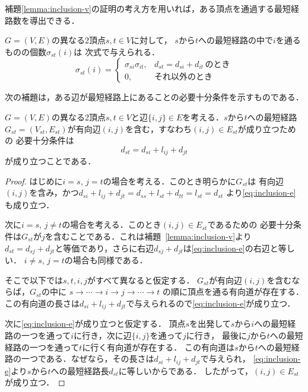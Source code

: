 補題\ref{lemma:inclusion-v}の証明の考え方を用いれば，ある頂点を通過する最短経路数を導出できる．

\begin{lemma-without-proof}
  $G=(V,E)$の異なる2頂点$s,t \in V$に対して，
  $s$から$t$への最短経路の中で$i$を通るものの個数$\sigma_{st}(i)$は
  次式で与えられる．
  \begin{equation}
    \sigma_{st}(i)=
    \begin{cases}
      \sigma_{si} \sigma_{it}, & d_{st}=d_{si}+d_{it}\,\text{のとき} \\
      0, & \text{それ以外のとき}
    \end{cases}
  \end{equation}
\end{lemma-without-proof}

次の補題は，ある辺が最短経路上にあることの必要十分条件を示すものである．

\begin{lemma}
  \label{lemma:inclusion-e}
  $G=(V,E)$の異なる2頂点$s,t\in V$と辺$\{i,j\} \in E$を考える．$s$から$t$への最短経路
  $G_{st}=(V_{st},E_{st})$が有向辺$(i,j)$を含む，すなわち$(i,j) \in E_{st}$が成り立つための
  必要十分条件は
  \begin{equation}
    d_{st}=d_{si}+l_{ij}+d_{jt}
    \label{eq:inclusion-e}
  \end{equation}
  が成り立つことである．
\end{lemma}
\begin{proof}
  はじめに$i=s$, $j=t$の場合を考える．このとき明らかに$G_{st}$は
  有向辺$(i,j)$を含み，かつ$d_{si}+l_{ij}+d_{jt}=d_{ss}+l_{st}+d_{tt}=l_{st}=d_{st}$
  より\eqref{eq:inclusion-e}も成り立つ．

  次に$i=s$, $j \neq t$の場合を考える．このとき$(i,j)\in E_{st}$であるための
  必要十分条件は$G_{st}$が$j$を含むことである．これは補題~\ref{lemma:inclusion-v}より
  $d_{st}=d_{sj}+d_{jt}$と等価であり，さらに右辺$d_{sj}+d_{jt}$は\eqref{eq:inclusion-e}の右辺と等しい．
  $i\neq s$, $j=t$の場合も同様である．

  そこで以下では$s,t,i,j$がすべて異なると仮定する．
  $G_{st}$が有向辺$(i,j)$を含むならば，$G_{st}$の中に
  $s \rightarrow \cdots \rightarrow i \rightarrow j \rightarrow \cdots \rightarrow t$
  の順に頂点を通る有向道が存在する．
  この有向道の長さは$d_{si}+l_{ij}+d_{jt}$で与えられるので\eqref{eq:inclusion-e}が成り立つ．

  次に\eqref{eq:inclusion-e}が成り立つと仮定する．
  頂点$s$を出発して$s$から$i$への最短経路の一つを通って$i$に行き，次に辺$\{i,j\}$を通って$j$に行き，
  最後に$j$から$t$への最短経路の一つを通って$t$に行く有向道が存在する．
  この有向道は$s$から$t$への最短経路の一つである．なぜなら，その長さは$d_{si}+l_{ij}+d_{jt}$で与えられ，
  \eqref{eq:inclusion-e}より$s$から$t$への最短経路長$d_{st}$に等しいからである．
  したがって，$(i,j) \in E_{st}$が成り立つ．
\end{proof}

